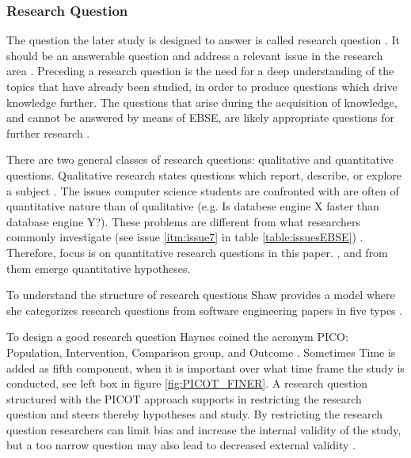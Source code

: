 
\subsubsection{Research Question}

The question the later study is designed to answer is called research question \cite{Vickers}. It should be an answerable question and address a relevant issue in the research area \cite{Dyba2005}. Preceding a research question is the need for a deep understanding of the topics that have already been studied, in order to produce questions which drive knowledge further. The questions that arise during the acquisition of knowledge, and cannot be answered by means of EBSE, are likely appropriate questions for further research \cite{Farrugia2009}.

There are two general classes of research questions: qualitative and quantitative questions. Qualitative research states questions which report, describe, or explore a subject \cite[p. 139-141]{Creswell2014}. The issues computer science students are confronted with are often of quantitative nature than of qualitative (e.g. Is databese engine X faster than database engine Y?). These problems are different from what researchers commonly investigate (see issue \ref{itm:issue7} in table \ref{table:issuesEBSE}) \cite{Rainer2006}. Therefore, focus is on quantitative research questions in this paper.  \cite[p. 143]{Creswell2014}, and from them emerge quantitative hypotheses.

To understand the structure of research questions Shaw provides a model where she categorizes research questions from software engineering papers in five types \cite{Shaw2002} . 

To design a good research question Haynes coined the acronym PICO: Population, Intervention, Comparison group, and Outcome \cite{BrianHaynes2006}. Sometimes Time is added as fifth component, when it is important over what time frame the study is conducted, see left box in figure \ref{fig:PICOT_FINER}. A research question structured with the PICOT approach supports in restricting the research question and steers thereby hypotheses and study. By restricting the research question researchers can limit bias and increase the internal validity of the study, but a too narrow question may also lead to decreased external validity \cite{Farrugia2009}. 

